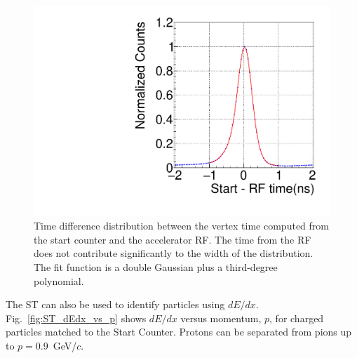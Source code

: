 
\begin{figure}[tbh]
  \centering
  \includegraphics[width=0.6\linewidth]{figures/st_tr_fit.pdf}  
  \caption{Time difference distribution between the vertex time computed from the start counter and the accelerator RF. The time from the RF does not contribute significantly to the width of the distribution. The fit function is a double Gaussian plus a third-degree polynomial.
  }
                \label{fig:st-time-resolution}
\end{figure}  


The ST can also be used to identify particles using $dE/dx$. Fig.~\ref{fig:ST_dEdx_vs_p} shows $dE/dx$ versus momentum, $p$,
for charged particles matched to the Start Counter. Protons can be
separated from pions up to $p=0.9$~GeV/$c$.

